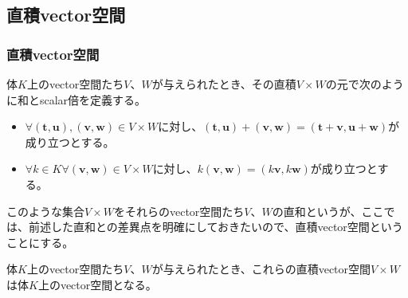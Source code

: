 \documentclass[dvipdfmx]{jsarticle}
\begin{document}
\subsection{直積vector空間}%
\subsubsection{直積vector空間}%
\begin{dfn}
体$K$上のvector空間たち$V$、$W$が与えられたとき、その直積$V \times W$の元で次のように和とscalar倍を定義する。
\begin{itemize}
\item
  $\forall\left( \mathbf{t},\mathbf{u} \right),\left( \mathbf{v},\mathbf{w} \right) \in V \times W$に対し、$\left( \mathbf{t},\mathbf{u} \right) + \left( \mathbf{v},\mathbf{w} \right) = \left( \mathbf{t} + \mathbf{v},\mathbf{u} + \mathbf{w} \right)$が成り立つとする。
\item
  $\forall k \in K\forall\left( \mathbf{v},\mathbf{w} \right) \in V \times W$に対し、$k\left( \mathbf{v},\mathbf{w} \right) = \left( k\mathbf{v},k\mathbf{w} \right)$が成り立つとする。
\end{itemize}
このような集合$V \times W$をそれらのvector空間たち$V$、$W$の直和というが、ここでは、前述した直和との差異点を明確にしておきたいので、直積vector空間ということにする。
\end{dfn}
\begin{thm}\label{2.4.9.1}
体$K$上のvector空間たち$V$、$W$が与えられたとき、これらの直積vector空間$V \times W$は体$K$上のvector空間となる。
\end{thm}
\end{document}
